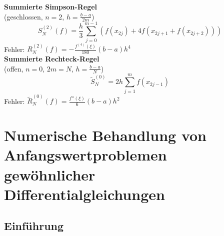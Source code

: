 \documentclass[
	ngerman,
	accentcolor=9c,%
	type=intern,
	marginpar=false
	]{tudapub}
\begin{document}
    
    \textbf{Summierte Simpson-Regel}\\
    (geschlossen, $n = 2$, $h=\frac{b-a}{2m}$)
    \begin{equation*}
        S^{(2)}_N(f)=\dfrac{h}{3}\sum^{m-1}_{j=0}(f(x_{2j}) + 4f(x_{2j+1} + f(x_{2j+2})))
    \end{equation*}
    Fehler: $R^{(2)}_N(f)=-\frac{f^{(4)}(\xi)}{180}(b-a)h^4$\\[2ex]

    \textbf{Summierte Rechteck-Regel}\\
    (offen, $n=0$, $2m = N$, $h = \frac{b-a}{N}$)
    \begin{equation*}
        \tilde{S}_N^{(0)} = 2h \sum^m_{j=1} f(x_{2j-1})
    \end{equation*}
    Fehler: $\tilde{R}^{(0)}_N(f)= \frac{f''(\xi)}{6}(b-a)h^2$
    \newpage

\section{Numerische Behandlung von Anfangswertproblemen gewöhnlicher Differentialgleichungen}
    \subsection{Einführung}
\end{document}
